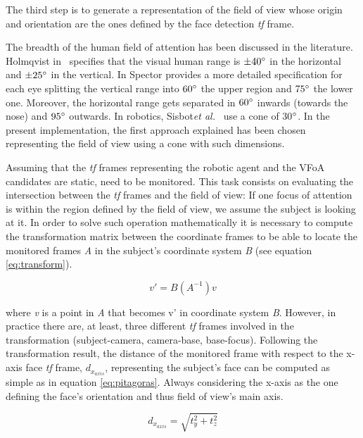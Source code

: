 \documentclass{sig-alternate}
\newcommand{\etal}{\textit{et al.}\xspace}
\begin{document}
The third step is to generate a representation of the field of view whose origin
and orientation are the ones defined by the face detection \textit{tf} frame. 

The breadth of the human field of attention has been discussed in the
literature.
Holmqvist in~\cite{holmqvist2011eye} specifies that the visual human
range is $
\pm  40\degree $ in the horizontal and $ \pm 25\degree $ in the vertical. In
\cite{walker1980clinical} Spector provides a more detailed specification for
each eye splitting the vertical range into $ 60\degree $ the upper region and $
75\degree $ the lower one. Moreover, the horizontal range gets separated in $
60\degree $ inwards (towards the nose) and $ 95\degree $ outwards. In robotics,
Sisbot\etal~\cite{sisbot2011situation} use a cone of 30$\degree$. In the
present implementation, the first approach explained has been chosen
representing the field of view using a cone with such dimensions.

Assuming that the \textit{tf} frames representing the robotic agent and the VFoA
candidates are static, need to be monitored. This task consists on evaluating
the intersection between the \textit{tf} frames and the field of view: If one
focus of attention is within the region defined by the field of view, we assume
the subject is looking at it. In order to solve such operation mathematically it
is necessary to compute the transformation matrix between the coordinate frames
to be able to locate the monitored frames \textit{A} in the subject's coordinate
system \textit{B} (see equation \ref{eq:transform}).

\begin{equation}
v' = B(A^{-1})v
\label{eq:transform}
\end{equation}

where \textit{v} is a point in \textit{A} that becomes v' in coordinate system
\textit{B}. However, in practice there are, at least, three different
\textit{tf} frames involved in the transformation (subject-camera, camera-base,
base-focus). Following the transformation result, the distance of the monitored
frame with respect to the x-axis face \textit{tf} frame, $ d_{x_{axis}} $,
representing the subject's face can be computed as simple as in equation
\ref{eq:pitagoras}. Always considering the x-axis as the one defining the face's
orientation and thus field of view's main axis.

\begin{equation}
d_{x_{axis}} = \sqrt{t_y^2 + t_z^2}
\label{eq:pitagoras}
\end{equation}
\end{document}
